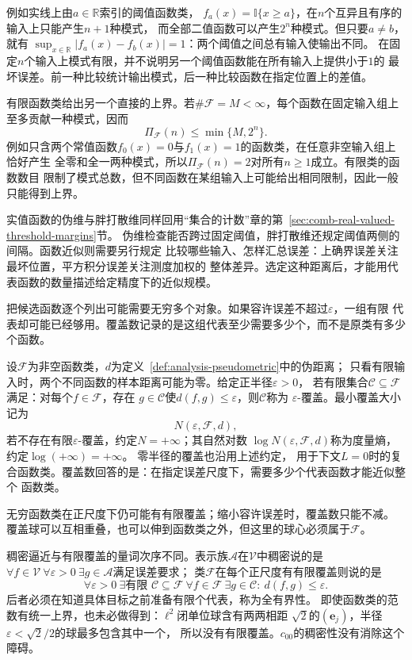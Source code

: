 例如实线上由$a\in\mathbb R$索引的阈值函数类，
$f_a(x)=\mathbb{I}\{x\geq a\}$，在$n$个互异且有序的输入上只能产生$n+1$种模式，
而全部二值函数可以产生$2^n$种模式。但只要$a\neq b$，就有
$\sup_{x\in\mathbb R}|f_a(x)-f_b(x)|=1$：两个阈值之间总有输入使输出不同。
在固定$n$个输入上模式有限，并不说明另一个阈值函数能在所有输入上提供小于$1$的
最坏误差。前一种比较统计输出模式，后一种比较函数在指定位置上的差值。

有限函数类给出另一个直接的上界。若$\#\mathcal{F}=M<\infty$，每个函数在固定输入组上
至多贡献一种模式，因而
\[
  \Pi_{\mathcal{F}}(n)\leq\min\{M,2^n\}.
\]
例如只含两个常值函数$f_0(x)=0$与$f_1(x)=1$的函数类，在任意非空输入组上恰好产生
全零和全一两种模式，所以$\Pi_{\mathcal{F}}(n)=2$对所有$n\geq1$成立。有限类的函数数目
限制了模式总数，但不同函数在某组输入上可能给出相同限制，因此一般只能得到上界。

实值函数的伪维与胖打散维同样回用“集合的计数”章的第~\ref{sec:comb-real-valued-threshold-margins}节。
伪维检查能否跨过固定阈值，胖打散维还规定阈值两侧的间隔。函数近似则需要另行规定
比较哪些输入、怎样汇总误差：上确界误差关注最坏位置，平方积分误差关注测度加权的
整体差异。选定这种距离后，才能用代表函数的数量描述给定精度下的近似规模。


把候选函数逐个列出可能需要无穷多个对象。如果容许误差不超过$\varepsilon$，一组有限
代表却可能已经够用。覆盖数记录的是这组代表至少需要多少个，而不是原类有多少个函数。
\begin{definition}[函数类的覆盖数与度量熵]
\label{def:functional-covering-number}
设$\mathcal F$为非空函数类，$d$为定义~\ref{def:analysis-pseudometric}中的伪距离；
只看有限输入时，两个不同函数的样本距离可能为零。给定正半径$\varepsilon>0$，
若有限集合$\mathcal{C}\subseteq\mathcal{F}$满足：对每个$f\in\mathcal{F}$，存在
$g\in\mathcal{C}$使$d(f,g)\leq\varepsilon$，则$\mathcal{C}$称为
$\varepsilon$-覆盖。最小覆盖大小记为
\[
  N(\varepsilon,\mathcal{F},d),
\]
若不存在有限$\varepsilon$-覆盖，约定$N=+\infty$；其自然对数
$\log N(\varepsilon,\mathcal F,d)$称为度量熵，约定$\log(+\infty)=+\infty$。
零半径的覆盖也沿用上述约定，
用于下文$L=0$时的复合函数类。覆盖数回答的是：在指定误差尺度下，需要多少个代表函数才能近似整个
函数类。
\end{definition}
无穷函数类在正尺度下仍可能有有限覆盖；缩小容许误差时，覆盖数只能不减。
覆盖球可以互相重叠，也可以伸到函数类之外，但这里的球心必须属于$\mathcal F$。

稠密逼近与有限覆盖的量词次序不同。表示族$\mathcal A$在$\mathcal V$中稠密说的是
$\forall f\in\mathcal V\ \forall\varepsilon>0\ \exists g\in\mathcal A$满足误差要求；
类$\mathcal F$在每个正尺度有有限覆盖则说的是
\[
 \forall\varepsilon>0\ \exists\text{有限 }\mathcal C\subseteq\mathcal F\
 \forall f\in\mathcal F\ \exists g\in\mathcal C:\ d(f,g)\leq\varepsilon.
\]
后者必须在知道具体目标之前准备有限个代表，称为全有界性。
即使函数类的范数有统一上界，也未必做得到：$\ell^2$闭单位球含有两两相距
$\sqrt2$的$(\bm e_j)$，半径$\varepsilon<\sqrt2/2$的球最多包含其中一个，
所以没有有限覆盖。$c_{00}$的稠密性没有消除这个障碍。

